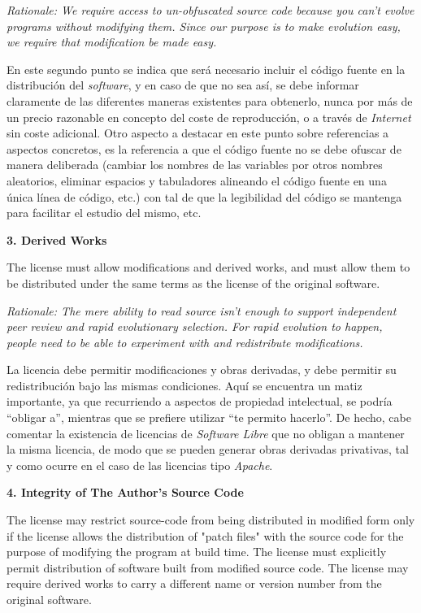 \textit{Rationale: We require access to un-obfuscated source code because you
can't evolve programs without modifying them. Since our purpose is to make
evolution easy, we require that modification be made easy.}\newline

En este segundo punto se indica que será necesario incluir el código fuente en
la distribución del \textit{software}, y en caso de que no sea así, se debe
informar claramente de las diferentes maneras existentes para obtenerlo, nunca
por más de un precio razonable en concepto del coste de reproducción, o a través
de \textit{Internet} sin coste adicional. Otro aspecto a destacar en este punto
sobre referencias a aspectos concretos, es la referencia a que el código fuente
no se debe ofuscar de manera deliberada (cambiar los nombres de las variables
por otros nombres aleatorios, eliminar espacios y tabuladores alineando el
código fuente en una única línea de código, etc.) con tal de que la legibilidad
del código se mantenga para facilitar el estudio del mismo, etc.\newline

{\bf 3. Derived Works

The license must allow modifications and derived works, and must allow them to
be distributed under the same terms as the license of the original software.}

\textit{Rationale: The mere ability to read source isn't enough to support
independent peer review and rapid evolutionary selection. For rapid evolution to
happen, people need to be able to experiment with and redistribute
modifications.}\newline

La licencia debe permitir modificaciones y obras derivadas, y debe permitir su
redistribución bajo las mismas condiciones. Aquí se encuentra un matiz
importante, ya que recurriendo a aspectos de propiedad intelectual, se podría
``obligar a'', mientras que se prefiere utilizar ``te permito
hacerlo''. De hecho, cabe comentar la existencia de licencias de
\textit{Software Libre} que no obligan a mantener la misma licencia, de modo que
se pueden generar obras derivadas privativas, tal y como ocurre en el caso de
las licencias tipo \textit{Apache}.\newline

{\bf 4. Integrity of The Author's Source Code

The license may restrict source-code from being distributed in modified form
only if the license allows the distribution of "patch files" with the source
code for the purpose of modifying the program at build time. The license must
explicitly permit distribution of software built from modified source code. The
license may require derived works to carry a different name or version number
from the original software.}

